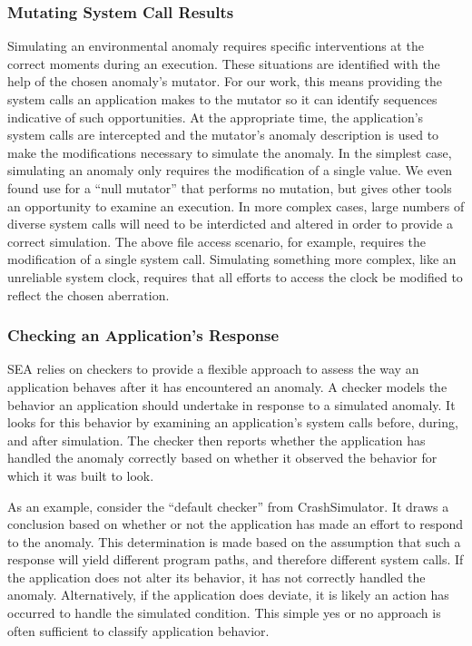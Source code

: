 \subsubsection{Mutating System Call Results}
\label{SUBSUB:MutatingCommunications}
Simulating an environmental anomaly requires specific interventions at the
correct moments during an execution.
These situations are identified
with the help of the chosen anomaly's
mutator.
For our work,
this means providing the system calls
an application makes to the
mutator
so it can identify sequences
indicative of such opportunities.
At the appropriate time,
the application's system calls
are intercepted
and the mutator's anomaly description is used to
make the modifications necessary
to simulate the anomaly.
In the simplest case,
simulating an anomaly only requires
the modification of a single value.
We even found use for a ``null mutator''
that performs no mutation, but gives other tools an opportunity to examine an execution.
In more complex cases,
large numbers of diverse system calls
will need to be interdicted and altered
in order to provide a correct simulation.
The above file access scenario, for example,
requires the modification of a single system call.
Simulating something more complex,
like an unreliable system clock,
requires that all efforts
to access the clock
be modified to reflect the chosen aberration.

\subsubsection{Checking an Application's Response}
\label{SUBSUB:CheckingResponse}
SEA relies on checkers
to provide a flexible approach to assess the way an application
behaves after it has encountered an anomaly.
A checker models
the behavior an application should undertake
in response to a simulated anomaly.
It looks for this behavior by examining an application's system calls
before, during, and after simulation.
The checker then reports whether the application has handled
the anomaly correctly
based on whether it observed the behavior for which it was built to look.

As an example, consider the ``default checker'' from CrashSimulator.
It draws a conclusion based on
whether or not the application
has made an effort to respond
to the anomaly.
This determination is made based
on the assumption
that such a response will yield
different program paths, and therefore different system calls.
If the application
does not alter its behavior, it has not
correctly handled the anomaly.
Alternatively,
if the application does deviate,
it is likely
an action has occurred to handle the simulated condition.
This simple yes or no approach
is often sufficient
to classify application behavior.

